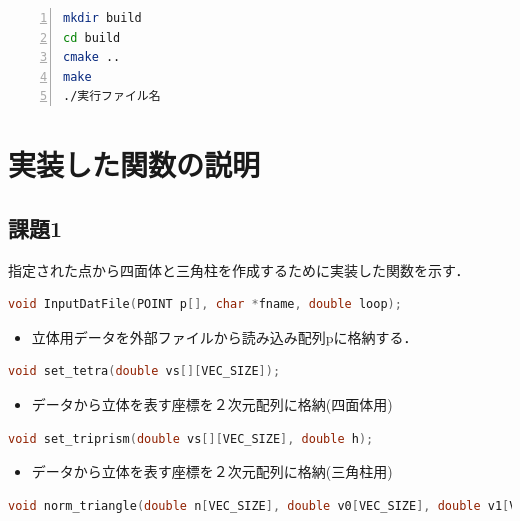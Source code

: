 \documentclass[a4paper,10pt]{jsarticle}
\begin{document}
\begin{lstlisting}[basicstyle=\ttfamily\footnotesize, language=Bash, frame=single, firstnumber=1, numbers=left, breaklines=true]
mkdir build
cd build
cmake ..
make
./実行ファイル名
\end{lstlisting}

\section{実装した関数の説明}
\subsection{課題1}
指定された点から四面体と三角柱を作成するために実装した関数を示す．

\begin{lstlisting}[basicstyle=\ttfamily\footnotesize, language=C, frame=single, numbers=none, breaklines=true]
void InputDatFile(POINT p[], char *fname, double loop);
\end{lstlisting}

\begin{itemize}
 \item 立体用データを外部ファイルから読み込み配列pに格納する．
\end{itemize}

\begin{lstlisting}[basicstyle=\ttfamily\footnotesize, language=C, frame=single, numbers=none, breaklines=true]
void set_tetra(double vs[][VEC_SIZE]);
\end{lstlisting}

\begin{itemize}
 \item データから立体を表す座標を２次元配列に格納(四面体用)
\end{itemize}

\begin{lstlisting}[basicstyle=\ttfamily\footnotesize, language=C, frame=single, numbers=none, breaklines=true]
void set_triprism(double vs[][VEC_SIZE], double h);
\end{lstlisting}

\begin{itemize}
 \item データから立体を表す座標を２次元配列に格納(三角柱用)
\end{itemize}

\begin{lstlisting}[basicstyle=\ttfamily\footnotesize, language=C, frame=single, numbers=none, breaklines=true]
void norm_triangle(double n[VEC_SIZE], double v0[VEC_SIZE], double v1[VEC_SIZE], double v2[VEC_SIZE]);
\end{lstlisting}
\end{document}
